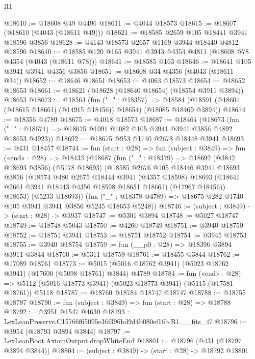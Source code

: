 \begin{lexlean}{R1}
\begin{coremodule}
@18610 := @18608 @49 @4496
@18611 := @4044 @18573
@18615 := @18607 (@18610 (@4043 (@18611 @49)))
@18621 := @18585 @2659 @105 @18441 @3941 @18596 @3856
@18628 := @4143 @18573 @2657 @1169 @3944 @18440 @4812 @18596
@18640 := @18585 @120 @165 @3941 @3943 @4354 @4811 (@18608 @78 @4354 (@4043 (@18611 @78)))
@18641 := @18585 @163
@18646 := @18641 @105 @3941 @3941 @4356 @3856
@18651 := @18608 @34 @4356 (@4043 (@18611 @34))
@18652 := @18646 @18651
@18653 := @4063 @18573
@18654 := @18652 @18653
@18661 := @18621 (@18628 (@18640 @18654) (@18554 @3911 @3894)) @18653
@18673 := @18564
    (fun ("_" : @18357) =>
    @18584 (@18591 (@18601 (@18615 @18661) (@14915 @18456)) @18654) (@18085 @18469 @3894))
@18674 := @18356 @4789
@18675 := @4018 @18573
@18687 := @18464
    (@18673 (fun ("_" : @18674) => @18675 @1091 @1082 @105 @3941 @3941 @3856 @4892 @18653 @4923))
@18692 := @18675 @953 @1740 @2678 @18448 @3941
@18693 := @431 @18457
@18744 := fun (start : @28) =>
  fun (subject : @3849) =>
  fun («end» : @28) =>
  @18433
    (@18687
      (fun ("_" : @18379) =>
      @18692
        (@3842 @18693 @3856)
        (@5178 @18693)
        (@18585
          @2676
          @105
          @18446
          @3941
          @18693
          @3856
          (@18574
            @480
            @2675
            @18444
            @3941
            (@4357 @18598)
            @18693
            (@18641 @2661 @3941 @18443 @4356 @18598 @18651 @18661)
            (@17967 @18456))
          @18653)
        (@5233 @18693))
      (fun ("_" : @18378 @4789) => @18675 @282 @1740 @105 @3941 @3941 @3856 @5245 @18653 @5248))
@18746 := (subject : @3849) -> (start : @28) -> @3937
@18747 := @5301 @3894
@18748 := @5027 @18747
@18749 := @18748 @5043
@18750 := @4260 @18749
@18751 := @3940 @18750
@18752 := @18751 @3941
@18753 := @18751 @18752
@18754 := @3945 @18753
@18755 := @3940 @18754
@18759 := fun (__p0 : @28) => @18396 @3894 @3911 @3844
@18760 := @5311 @18759
@18761 := @18455 @3844
@18762 := @17089 @18761
@18773 := @5015 (@5016 @18762 @3941) (@5023 @18762 @3941) (@17600 (@5098 @18761) @3844) @4789
@18784 := fun («end» : @28) =>
  @5112 (@5016 @18773 @3941) (@5023 @18773 @3941) (@5115 (@17581 @18761)) @5118
@18787 := @18760 @18784 @18747 @18747
@18788 := @18755 @18787
@18790 := fun (subject : @3849) => fun (start : @28) => @18788
@18792 := @3951 @1547 @4630
@18793 := LexLeanPreserve.C15766f65095e36f396bd9d4b080ef16b.R1.__fits_47
@18796 := @3954 (@18793 @3894 @3844)
@18797 := LexLeanBoot.AxiomOutput.dropWhiteEnd
@18801 := @18796 (@431 (@18797 @3894 @3844))
@18804 := (subject : @3849) -> (start : @28) -> @18792 @18801

\end{coremodule}
\end{lexlean}
